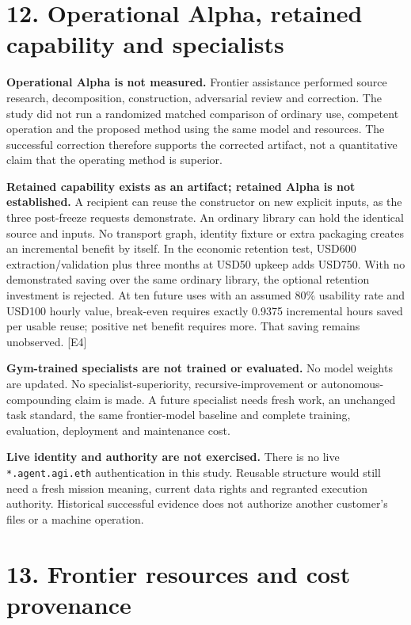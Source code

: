 \documentclass[11pt,letterpaper]{article}
\begin{document}
\hypertarget{operational-alpha-retained-capability-and-specialists}{%
\section{12. Operational Alpha, retained capability and specialists}\label{operational-alpha-retained-capability-and-specialists}}

\textbf{Operational Alpha is not measured.} Frontier assistance performed source research, decomposition, construction, adversarial review and correction. The study did not run a randomized matched comparison of ordinary use, competent operation and the proposed method using the same model and resources. The successful correction therefore supports the corrected artifact, not a quantitative claim that the operating method is superior.

\textbf{Retained capability exists as an artifact; retained Alpha is not established.} A recipient can reuse the constructor on new explicit inputs, as the three post-freeze requests demonstrate. An ordinary library can hold the identical source and inputs. No transport graph, identity fixture or extra packaging creates an incremental benefit by itself. In the economic retention test, USD600 extraction/validation plus three months at USD50 upkeep adds USD750. With no demonstrated saving over the same ordinary library, the optional retention investment is rejected. At ten future uses with an assumed 80\% usability rate and USD100 hourly value, break-even requires exactly 0.9375 incremental hours saved per usable reuse; positive net benefit requires more. That saving remains unobserved. {[}E4{]}

\textbf{Gym-trained specialists are not trained or evaluated.} No model weights are updated. No specialist-superiority, recursive-improvement or autonomous-compounding claim is made. A future specialist needs fresh work, an unchanged task standard, the same frontier-model baseline and complete training, evaluation, deployment and maintenance cost.

\textbf{Live identity and authority are not exercised.} There is no live \nolinkurl{*.agent.agi.eth} authentication in this study. Reusable structure would still need a fresh mission meaning, current data rights and regranted execution authority. Historical successful evidence does not authorize another customer's files or a machine operation.

\hypertarget{frontier-resources-and-cost-provenance}{%
\section{13. Frontier resources and cost provenance}\label{frontier-resources-and-cost-provenance}}
\end{document}
